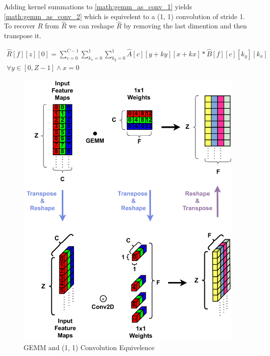 Adding kernel summations to \autoref{math:gemm_as_conv_1} yields
\autoref{math:gemm_as_conv_2} which is equivelent to a (1, 1) convolution of stride
1. To recover $R$ from $\hat{R}$ we can reshape $\hat{R}$ by removing the
last dimention and then transpose it. 

\begin{equation}
    \begin{aligned}
        \hat{R}[f][z][0] = \displaystyle\sum\limits_{c=0}^{C-1}\displaystyle\sum\limits_{k_x=0}^{1} \displaystyle\sum\limits_{k_y=0}^{1}\hat{A}[c][y+ky][x+kx]*\hat{B}[f][c][k_y][k_x] \\ \forall y \in [0, Z-1] \land x = 0
    \end{aligned}
    \label{math:gemm_as_conv_2}
\end{equation}

\begin{figure}[]
    \centering
    \includegraphics[scale=0.5]{fig/GemmTo1x1Conv.pdf}
    \caption{\ac{GEMM} and (1, 1) Convolution Equivelence}
    \label{fig:gemmTo1x1Conv}
\end{figure}


